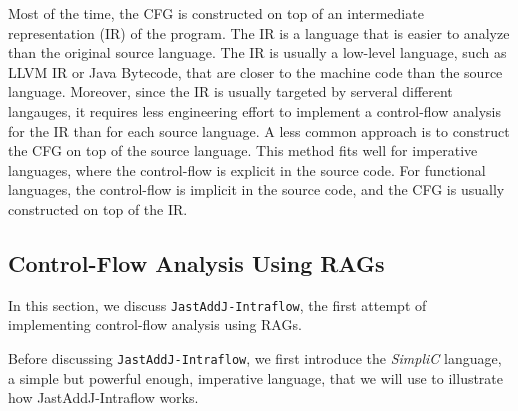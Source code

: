 Most of the time, the CFG is constructed on top of an intermediate representation
(IR) of the program. The IR is a language that is easier to analyze than the original
source language. The IR is usually a low-level language, such as LLVM IR or Java Bytecode, that are
closer to the machine code than the source language. 
Moreover, since the IR is usually targeted by serveral different langauges, 
it requires less engineering effort to implement a control-flow analysis for the IR than for each
source language.
A less common approach is to construct the CFG on top of the source language.
This method fits well for imperative languages, where the control-flow is 
explicit in the source code. For functional languages, the
control-flow is implicit in the source code, and the CFG is usually constructed
on top of the IR.




\subsection{Control-Flow Analysis Using RAGs}
\label{sec:cfarag}
In this section, we discuss \texttt{JastAddJ-Intraflow}, the first attempt of 
implementing control-flow analysis using RAGs.

Before discussing \texttt{JastAddJ-Intraflow}, we first introduce the 
\emph{SimpliC} language, a simple but powerful enough,  imperative language, that we 
will use to illustrate how JastAddJ-Intraflow works.


